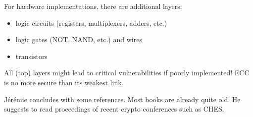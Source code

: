 \documentclass[11pt]{article}
\begin{document}
For hardware implementations, there are additional layers:
\begin{itemize}
	\item logic circuits (registers, multiplexers, adders, etc.)
	\item logic gates (NOT, NAND, etc.) and wires
	\item transistors
\end{itemize}

All (top) layers might lead to critical vulnerabilities if poorly implemented! ECC is no more secure than its weakest link.

Jérémie concludes with some references. Most books are already quite old. He suggests to read proceedings of recent crypto conferences such as CHES.
\end{document}
